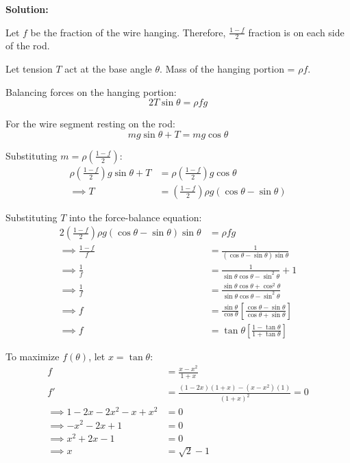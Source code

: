 \documentclass{article}
\theoremstyle{definition}
\newenvironment{solution}
  {\par\vspace{0.5em}\noindent\textbf{Solution:}\par\nopagebreak\vspace{0.3em}}
  {\par\vspace{1em}}
\begin{document}
\begin{solution}
    Let $f$ be the fraction of the wire hanging.  
    Therefore, $\frac{1-f}{2}$ fraction is on each side of the rod.
    
    Let tension $T$ act at the base angle $\theta$.  
    Mass of the hanging portion = $\rho f$.
    
    Balancing forces on the hanging portion:
    $$2T \sin\theta = \rho f g$$
    
    For the wire segment resting on the rod:
    $$mg \sin\theta + T = mg \cos\theta$$
    
    Substituting $m = \rho \left(\frac{1-f}{2}\right)$:
    \begin{align*}
        \rho \left(\frac{1-f}{2}\right) g \sin\theta + T &= \rho \left(\frac{1-f}{2}\right) g \cos\theta \\
        \implies T &= \left(\frac{1-f}{2}\right) \rho g (\cos\theta - \sin\theta)
    \end{align*}
    
    Substituting $T$ into the force-balance equation:
    \begin{align*}
        2\left(\frac{1-f}{2}\right) \rho g (\cos\theta - \sin\theta) \sin\theta &= \rho f g \\
        \implies \frac{1-f}{f} &= \frac{1}{(\cos\theta - \sin\theta) \sin\theta} \\
        \implies \frac{1}{f} &= \frac{1}{\sin\theta \cos\theta - \sin^2\theta} + 1 \\
        \implies \frac{1}{f} &= \frac{\sin\theta \cos\theta + \cos^2\theta}{\sin\theta \cos\theta - \sin^2\theta} \\
        \implies f &= \frac{\sin\theta}{\cos\theta} \left[ \frac{\cos\theta - \sin\theta}{\cos\theta + \sin\theta} \right] \\
        \implies f &= \tan\theta \left[ \frac{1 - \tan\theta}{1 + \tan\theta} \right]
    \end{align*}

    To maximize $f(\theta)$, let $x = \tan\theta$:
    \begin{align*}
        f &= \frac{x - x^2}{1 + x} \\
        f' &= \frac{(1 - 2x)(1 + x) - (x - x^2)(1)}{(1 + x)^2} = 0 \\
        \implies 1 - 2x - 2x^2 - x + x^2 &= 0 \\
        \implies -x^2 - 2x + 1 &= 0 \\
        \implies x^2 + 2x - 1 &= 0 \\
        \implies x &= \sqrt{2} - 1
    \end{align*}
    

\end{solution}
\end{document}

